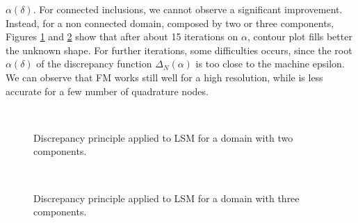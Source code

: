 $\alpha(\delta)$. For connected inclusions, we cannot observe a significant improvement. 
Instead, for a non connected domain, composed by two or three components, Figures \ref{fig:discrepancy_two_ellipse} 
and \ref{fig:discrepancy_three_ellipse}
show that after about 15 iterations on $\alpha$, contour plot fills better the unknown shape.
For further iterations, some difficulties occurs, since the root $\alpha(\delta)$ of the discrepancy 
function $\Delta_N(\alpha)$ is too close to the machine epsilon. 
We can observe that FM works still well for a high resolution, while is less accurate for a few 
number of quadrature nodes.
\begin{center}
\begin{figure}%
\\
\caption{Discrepancy principle applied to LSM for a domain with two components.}
\label{fig:discrepancy_two_ellipse}
\end{figure}
\end{center}

\begin{center}
\begin{figure}%
\\
\caption{Discrepancy principle applied to LSM for a domain with three components.}
\label{fig:discrepancy_three_ellipse}
\end{figure}
\end{center}

